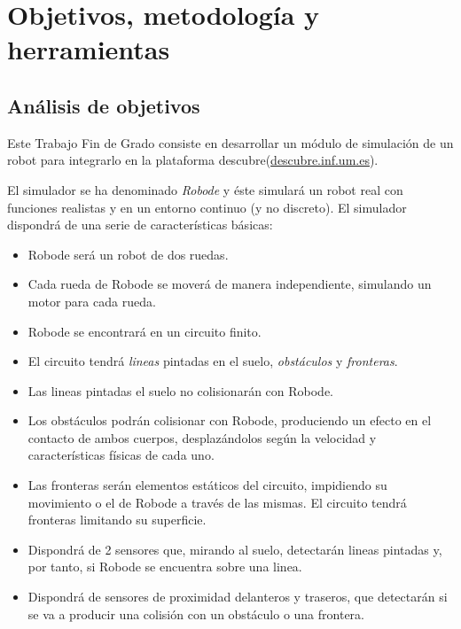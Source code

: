 \chapter{Objetivos, metodología y herramientas}
\label{objetivos-metodologia-herramientas}

\section{Análisis de objetivos}
\label{sec:objetivos}

Este Trabajo Fin de Grado consiste en desarrollar un módulo de simulación de un robot para integrarlo en la plataforma \Gls{descubre}(\url{descubre.inf.um.es}).

El simulador se ha denominado \emph{Robode} y éste simulará un robot real con {\color{red}funciones realistas} y en un entorno continuo {\color{red}(y no discreto)}. El simulador dispondrá de una serie de características básicas:
\begin{itemize}
	\item Robode será un robot de dos ruedas.
	\item Cada rueda de Robode se moverá de manera independiente, simulando un motor para cada rueda. 
	\item Robode se encontrará en un circuito finito. 
	\item El circuito tendrá \emph{lineas} pintadas en el suelo, \emph{obstáculos} y \emph{fronteras}.
	\item Las lineas pintadas el suelo no colisionarán con Robode.
	\item Los obstáculos podrán colisionar con Robode, produciendo un efecto en el contacto de ambos cuerpos, desplazándolos según la velocidad y características físicas de cada uno.
	\item Las fronteras serán elementos estáticos del circuito, impidiendo su movimiento o el de Robode a través de las mismas. El circuito tendrá fronteras limitando su superficie.
	\item Dispondrá de 2 sensores que, mirando al suelo, detectarán lineas pintadas y, por tanto, si Robode se encuentra sobre una linea.
	\item Dispondrá de sensores de proximidad delanteros y traseros, que detectarán si se va a producir una colisión con un obstáculo o una frontera.
\end{itemize}


